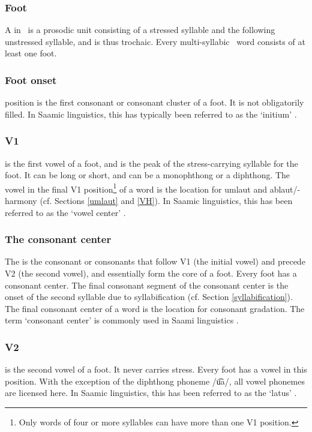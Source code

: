 \subsubsection{Foot}\label{foot}
A  in \PS\ is a prosodic unit consisting of a stressed syllable and the following unstressed syllable, and is thus trochaic. Every multi-syllabic \PS\ word consists of at least one foot. 

\subsubsection{Foot onset}\label{footOnset}
 position is the first consonant or consonant cluster of a foot. It is not obligatorily filled. 
In Saamic linguistics, this has typically been referred to as the ‘initium’ \citep[cf.][p?p]{Sammallahti1998}.

\subsubsection{V1}\label{v1}
 is the first vowel of a foot, and is the peak of the stress-carrying syllable for the foot. It can be long or short, and can be a monophthong or a diphthong. The vowel in the final V1 position\footnote{Only words of four or more syllables can have more than one V1 position.}
 of a word is the location for umlaut and ablaut/-harmony (cf. Sections \ref{umlaut} and \ref{VH}). 
In Saamic linguistics, this has been referred to as the ‘vowel center’ \citep[cf.][p?p]{Sammallahti1998}.

\subsubsection{The consonant center}\label{CCent}
The  is the consonant or consonants that follow V1 (the initial vowel) and precede V2 (the second vowel), and essentially form the core 
of a foot. Every foot has a consonant center. The final consonant segment of the consonant center is the onset of the second syllable due to syllabification (cf. Section \ref{syllabification}). The final consonant center of a word is the location for consonant gradation. The term ‘consonant center’ is commonly used in Saami linguistics \citep[cf.][p?p]{Sammallahti1998}. 

\subsubsection{V2}\label{v2}
 is the second vowel of a foot. It never carries stress. Every foot has a vowel in this position. With the exception of the diphthong phoneme /u͡a/, all vowel phonemes are licensed here. 
In Saamic linguistics, this has been referred to as the ‘latus’ \citep[cf.][p?p]{Sammallahti1998}.

